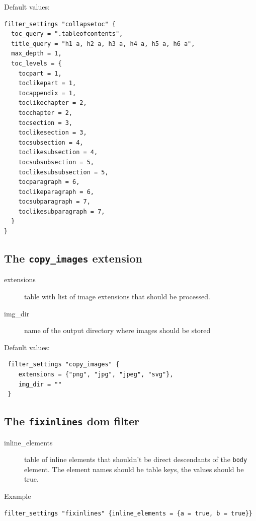 Default values:

\begin{verbatim}
filter_settings "collapsetoc" {
  toc_query = ".tableofcontents",
  title_query = "h1 a, h2 a, h3 a, h4 a, h5 a, h6 a",
  max_depth = 1,
  toc_levels = {
    tocpart = 1,
    toclikepart = 1,
    tocappendix = 1,
    toclikechapter = 2,
    tocchapter = 2,
    tocsection = 3,
    toclikesection = 3,
    tocsubsection = 4,
    toclikesubsection = 4,
    tocsubsubsection = 5,
    toclikesubsubsection = 5,
    tocparagraph = 6,
    toclikeparagraph = 6,
    tocsubparagraph = 7,
    toclikesubparagraph = 7,
  }
}
\end{verbatim}

\subsection{\texorpdfstring{The \texttt{copy\_images}
extension}{The copy\_images extension}}\label{the-copy_images-extension}

\begin{description}
\item[extensions]
table with list of image extensions that should be processed.
\item[img\_dir]
name of the output directory where images should be stored
\end{description}

Default values:

\begin{verbatim}
 filter_settings "copy_images" {
    extensions = {"png", "jpg", "jpeg", "svg"},
    img_dir = ""
 }
\end{verbatim}

\subsection{\texorpdfstring{The \texttt{fixinlines} dom
filter}{The fixinlines dom filter}}\label{the-fixinlines-dom-filter}

\begin{description}
\item[inline\_elements]
table of inline elements that shouldn't be direct descendants of the
\texttt{body} element. The element names should be table keys, the
values should be true.
\end{description}

Example

\begin{verbatim}
filter_settings "fixinlines" {inline_elements = {a = true, b = true}}
\end{verbatim}

